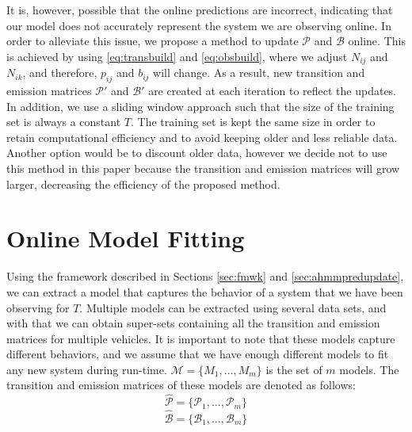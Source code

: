 \documentclass[letterpaper, 10 pt, conference]{ieeeconf}  %
\newcommand\NB[1]{$\spadesuit$\footnote{NB: #1}}
\newcommand\RP[1]{$\clubsuit$\footnote{RP: #1}}
\begin{document}

It is, however, possible that the online predictions are incorrect, indicating that our model does not accurately represent the system we are observing online. In order to alleviate this issue, we propose a method to update $\mathcal{P}$ and $\mathcal{B}$ online. This is achieved by using \eqref{eq:transbuild} and \eqref{eq:obsbuild}, where we adjust $N_{ij}$ and $N_{ik}$, and therefore, $p_{ij}$ and $b_{ij}$ will change. As a result, new transition and emission matrices $\mathcal{P'}$ and $\mathcal{B'}$ are created at each iteration to reflect the updates. In addition, we use a sliding window approach such that the size of the training set is always a constant $T$. %
The training set is kept the same size in order to retain computational efficiency and to avoid keeping older and less reliable data. Another option would be to discount older data, however we decide not to use this method in this paper because the transition and emission matrices will grow larger, decreasing the efficiency of the proposed method. 

\section{Online Model Fitting}\label{sec:omf}
Using the framework described in Sections \ref{sec:fmwk} and \ref{sec:ahmmpredupdate}, we can extract a model that captures the behavior of a system that we have been observing for $T$. Multiple models can be extracted using several data sets, and with that we can obtain super-sets containing all the transition and emission matrices for multiple vehicles. It is important to note that these models capture different behaviors, and we assume that we have enough different models to fit any new system during run-time. $\mathcal{M} = \{M_1,\ldots,M_m\}$ is the set of $m$ models. %
The transition and emission matrices of these models are denoted as follows: %
\begin{equation}
    \hat{\mathcal{P}} = \{\mathcal{P}_1,\ldots,\mathcal{P}_m\}
\end{equation}
\begin{equation}
    \hat{\mathcal{B}} = \{\mathcal{B}_1,\ldots,\mathcal{B}_{m}\}
\end{equation}
\end{document}
